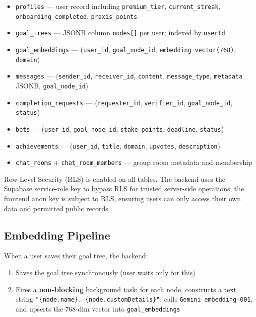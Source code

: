 \documentclass[11pt,a4paper]{article}
\begin{document}
\begin{itemize}
  \item \texttt{profiles} — user record including \texttt{premium\_tier}, \texttt{current\_streak}, \texttt{onboarding\_completed}, \texttt{praxis\_points}
  \item \texttt{goal\_trees} — JSONB column \texttt{nodes[]} per user; indexed by \texttt{userId}
  \item \texttt{goal\_embeddings} — (\texttt{user\_id}, \texttt{goal\_node\_id}, \texttt{embedding vector(768)}, \texttt{domain})
  \item \texttt{messages} — (\texttt{sender\_id}, \texttt{receiver\_id}, \texttt{content}, \texttt{message\_type}, \texttt{metadata} JSONB, \texttt{goal\_node\_id})
  \item \texttt{completion\_requests} — (\texttt{requester\_id}, \texttt{verifier\_id}, \texttt{goal\_node\_id}, \texttt{status})
  \item \texttt{bets} — (\texttt{user\_id}, \texttt{goal\_node\_id}, \texttt{stake\_points}, \texttt{deadline}, \texttt{status})
  \item \texttt{achievements} — (\texttt{user\_id}, \texttt{title}, \texttt{domain}, \texttt{upvotes}, \texttt{description})
  \item \texttt{chat\_rooms} + \texttt{chat\_room\_members} — group room metadata and membership
\end{itemize}

Row-Level Security (RLS) is enabled on all tables. The backend uses the Supabase service-role key to bypass RLS for trusted server-side operations; the frontend anon key is subject to RLS, ensuring users can only access their own data and permitted public records.

\subsection{Embedding Pipeline}

When a user saves their goal tree, the backend:
\begin{enumerate}
  \item Saves the goal tree synchronously (user waits only for this)
  \item Fires a \textbf{non-blocking} background task: for each node, constructs a text string \texttt{"\{node.name\}. \{node.customDetails\}"}, calls \texttt{Gemini embedding-001}, and upserts the 768-dim vector into \texttt{goal\_embeddings}
\end{enumerate}
\end{document}
